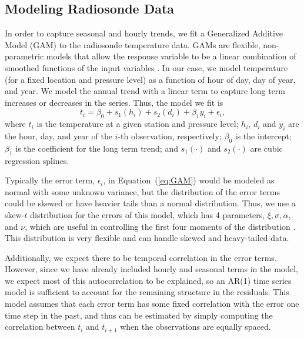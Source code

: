 \documentclass[12pt]{article}
\def\ni{\noindent}
\begin{document}
\begin{doublespacing}
\subsection{Modeling Radiosonde Data}
\label{ssec:model}

In order to capture seasonal and hourly trends, we fit a Generalized Additive Model (GAM) to the radiosonde temperature data.  GAMs are flexible, non-parametric models that allow the response variable to be a linear combination of smoothed functions of the input variables \cite{hastie90}.  In our case, we model temperature (for a fixed location and pressure level) as a function of hour of day, day of year, and year.  We model the annual trend with a linear term to capture long term increases or decreases in the series.  Thus, the model we fit is
\begin{equation} \label{eq:GAM}
	t_i = \beta_0 + s_1(h_i) + s_2(d_i) + \beta_1 y_i + \epsilon_i,
\end{equation}
\ni where $t_i$ is the temperature at a given station and pressure level; $h_i$, $d_i$ and $y_i$ are the hour, day, and year of the $i$-th observation, respectively; $\beta_0$ is the intercept; $\beta_1$ is the coefficient for the long term trend; and $s_1(\cdot)$ and $s_2(\cdot)$ are cubic regression splines.

Typically the error term, $\epsilon_i$, in Equation~(\ref{eq:GAM}) would be modeled as normal with some unknown variance, but the distribution of the error terms could be skewed or have heavier tails than a normal distribution.  Thus, we use a skew-$t$ distribution for the errors of this model, which has 4 parameters, $\xi, \sigma, \alpha$, and $\nu$, which are useful in controlling the first four moments of the distribution \cite{azzalini03}.  This distribution is very flexible and can handle skewed and heavy-tailed data.

Additionally, we expect there to be temporal correlation in the error terms.  However, since we have already included hourly and seasonal terms in the model, we expect most of this autocorrelation to be explained, so an AR(1) time series model is sufficient to account for the remaining structure in the residuals.  This model assumes that each error term has some fixed correlation with the error one time step in the past, and thus can be estimated by simply computing the correlation between $t_i$ and $t_{i+1}$ when the observations are equally spaced.


\end{doublespacing}
\end{document}
